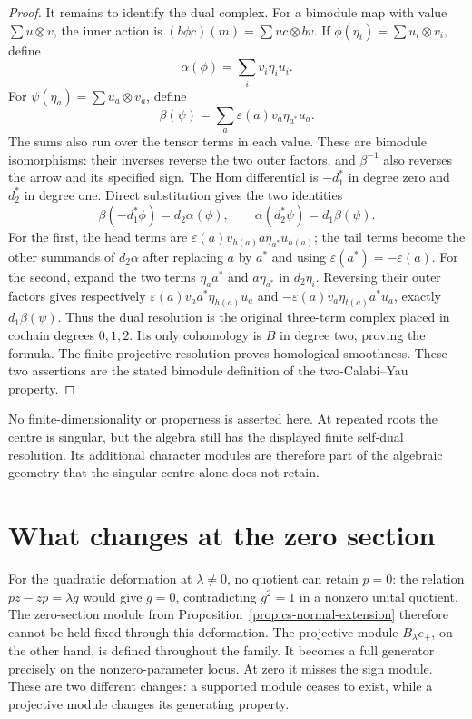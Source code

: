\begin{proof}
It remains to identify the dual complex. For a bimodule map with
value \(\sum u\otimes v\), the inner action is
\((b\phi c)(m)=\sum uc\otimes bv\).
If \(\phi(\eta_i)=\sum u_i\otimes v_i\), define
\[
 \alpha(\phi)=\sum_i v_i\eta_i u_i.
\]
For \(\psi(\eta_a)=\sum u_a\otimes v_a\), define
\[
 \beta(\psi)=\sum_a\varepsilon(a)v_a\eta_{a^*}u_a.
\]
The sums also run over the tensor terms in each value.
These are bimodule isomorphisms: their inverses reverse the two
outer factors, and \(\beta^{-1}\) also reverses the arrow and its
specified sign.
The Hom differential is \(-d_1^*\) in degree zero and \(d_2^*\)
in degree one. Direct substitution gives the two identities
\[
 \beta(-d_1^*\phi)=d_2\alpha(\phi),\qquad
 \alpha(d_2^*\psi)=d_1\beta(\psi).
\]
For the first, the head terms are
\(\varepsilon(a)v_{h(a)}a\eta_{a^*}u_{h(a)}\);
the tail terms become the other summands of \(d_2\alpha\)
after replacing \(a\) by \(a^*\) and using
\(\varepsilon(a^*)=-\varepsilon(a)\).
For the second, expand the two terms
\(\eta_a a^*\) and \(a\eta_{a^*}\) in \(d_2\eta_i\).
Reversing their outer factors gives respectively
\(\varepsilon(a)v_a a^*\eta_{h(a)}u_a\) and
\(-\varepsilon(a)v_a\eta_{t(a)}a^*u_a\), exactly
\(d_1\beta(\psi)\).
Thus the dual resolution is the original three-term complex
placed in cochain degrees \(0,1,2\).
Its only cohomology is \(B\) in degree two, proving the formula.
The finite projective resolution proves homological smoothness.
These two assertions are the stated bimodule definition of the
two-Calabi--Yau property.
\end{proof}

No finite-dimensionality or properness is asserted here.
At repeated roots the centre is singular, but the algebra still
has the displayed finite self-dual resolution. Its additional
character modules are therefore part of the algebraic geometry
that the singular centre alone does not retain.

\section{What changes at the zero section}

For the quadratic deformation at \(\lambda\ne0\), no quotient
can retain \(p=0\): the relation \(pz-zp=\lambda g\) would give
\(g=0\), contradicting \(g^2=1\) in a nonzero unital quotient.
The zero-section module from
Proposition~\ref{prop:cs-normal-extension} therefore cannot be
held fixed through this deformation.
The projective module \(B_\lambda e_+\), on the other hand, is
defined throughout the family. It becomes a full generator
precisely on the nonzero-parameter locus. At zero it misses the
sign module. These are two different changes: a supported module
ceases to exist, while a projective module changes its generating
property.

